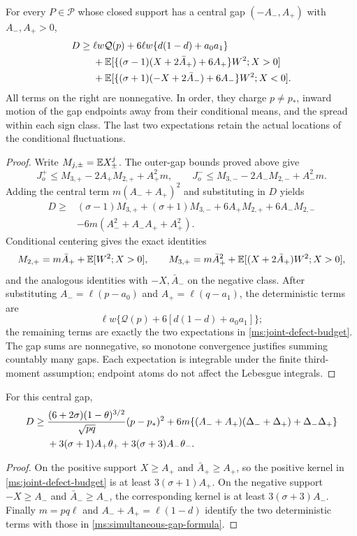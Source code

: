 \begin{lemma}\label{ms:joint-defect}
For every $P\in\mathcal P$ whose closed support has a central gap
$(-A_-,A_+)$ with $A_-,A_+>0$,
\begin{align}
 D\ge{}&\ell w\mathcal Q(p)+6\ell w\{d(1-d)+a_0a_1\}\notag\\
 &+\mathbb E[\{(\sigma-1)(X+2\bar A_+)+6A_+\}W^2;X>0]\notag\\
 &+\mathbb E[\{(\sigma+1)(-X+2\bar A_-)+6A_-\}W^2;X<0].
 \label{ms:joint-defect-budget}
\end{align}
All terms on the right are nonnegative. In order, they charge
$p\ne p_*$, inward motion of the gap endpoints away from their conditional
means, and the spread within each sign class. The last two expectations
retain the actual locations of the conditional fluctuations.
\end{lemma}
\begin{proof}
Write $M_{j,\pm}=\mathbb E X_\pm^j$. The outer-gap bounds proved above give
\[
 J_o^+\le M_{3,+}-2A_+M_{2,+}+A_+^2m,\qquad
 J_o^-\le M_{3,-}-2A_-M_{2,-}+A_-^2m.
\]
Adding the central term $m(A_-+A_+)^2$ and substituting in $D$ yields
\begin{align*}
 D\ge{}&(\sigma-1)M_{3,+}+(\sigma+1)M_{3,-}
       +6A_+M_{2,+}+6A_-M_{2,-}\\
       &-6m(A_-^2+A_-A_++A_+^2).
\end{align*}
Conditional centering gives the exact identities
\[
 M_{2,+}=m\bar A_++\mathbb E[W^2;X>0],\qquad
 M_{3,+}=m\bar A_+^2+\mathbb E[(X+2\bar A_+)W^2;X>0],
\]
and the analogous identities with $-X,\bar A_-$ on the negative class.
After substituting $A_-=\ell(p-a_0)$ and $A_+=\ell(q-a_1)$, the
deterministic terms are
\[
 \ell w\{\mathcal Q(p)+6[d(1-d)+a_0a_1]\};
\]
the remaining terms are exactly the two expectations in
\eqref{ms:joint-defect-budget}. The gap sums are nonnegative, so
monotone convergence justifies summing countably many gaps. Each
expectation is integrable under the finite third-moment assumption;
endpoint atoms do not affect the Lebesgue integrals.
\end{proof}

\begin{corollary}
\label{ms:simultaneous-gap}
For this central gap,
\begin{align}
 D\ge{}&\frac{(6+2\sigma)(1-\theta)^{3/2}}{\sqrt{pq}}(p-p_*)^2
 +6m\{(A_-+A_+)(\Delta_-+\Delta_+)+\Delta_-\Delta_+\}\notag\\
 &+3(\sigma+1)A_+\theta_++3(\sigma+3)A_-\theta_-.
\label{ms:simultaneous-gap-formula}
\end{align}
\end{corollary}
\begin{proof}
On the positive support $X\ge A_+$ and $\bar A_+\ge A_+$, so the positive
kernel in \eqref{ms:joint-defect-budget} is at least $3(\sigma+1)A_+$.
On the negative support $-X\ge A_-$ and $\bar A_-\ge A_-$, the corresponding
kernel is at least $3(\sigma+3)A_-$. Finally $m=pq\ell$ and
$A_-+A_+=\ell(1-d)$ identify the two deterministic terms with those in
\eqref{ms:simultaneous-gap-formula}.
\end{proof}
